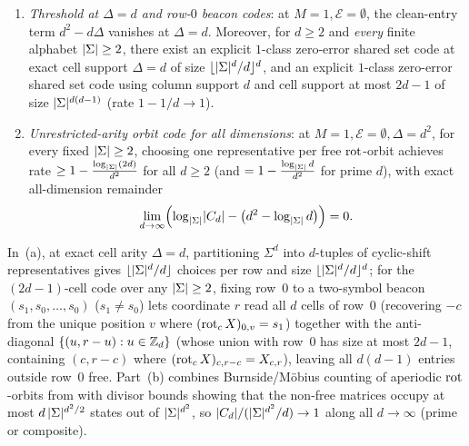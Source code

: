 \begin{proposition}\label{prop:boundary-wall1}
\begin{enumerate}[label=(\alph*)]
\item \emph{Threshold at $\Delta = d$ and row-$0$ beacon codes}: at $M = 1, \mathcal{E} = \emptyset$,
  the clean-entry term $d^2 - d\Delta$ vanishes at $\Delta = d$. Moreover, for $d \ge 2$ and
  \emph{every} finite alphabet $\lvert \Sigma \rvert \ge 2$, there exist an explicit $1$-class zero-error
  shared set code at exact cell support $\Delta = d$ of size $\lfloor \lvert \Sigma \rvert^d / d \rfloor^d$,
  and an explicit $1$-class zero-error shared set code using column support $d$ and cell support at
  most $2d - 1$ of size $\lvert \Sigma \rvert^{d(d-1)}$ (rate $1 - 1/d \to 1$).
\item \emph{Unrestricted-arity orbit code for all dimensions}: at $M = 1, \mathcal{E} = \emptyset,
  \Delta = d^2$, for every fixed $\lvert \Sigma \rvert \ge 2$, choosing one representative per free
  $\operatorname{rot}$-orbit achieves rate $\ge 1 - \frac{\log_{\lvert \Sigma \rvert}(2d)}{d^2}$ for all $d \ge 2$
  (and $= 1 - \frac{\log_{\lvert \Sigma \rvert} d}{d^2}$ for prime $d$), with exact all-dimension remainder
  \[
    \lim_{d\to\infty}\Bigl(\log_{\lvert \Sigma \rvert}\lvert C_d \rvert - \bigl(d^2 - \log_{\lvert \Sigma \rvert} d\bigr)\Bigr) = 0.
  \]
\end{enumerate}
\end{proposition}
\begin{outline}
In~(a), at exact cell arity $\Delta = d$, partitioning $\Sigma^d$ into $d$-tuples of cyclic-shift
representatives gives $\lfloor \lvert \Sigma \rvert^d / d \rfloor$ choices per row and size
$\lfloor \lvert \Sigma \rvert^d / d \rfloor^d$; for the $(2d-1)$-cell code over any $\lvert \Sigma \rvert \ge 2$,
fixing row~$0$ to a two-symbol beacon $(s_1, s_0, \dots, s_0)$ ($s_1 \ne s_0$) lets coordinate $r$
read all $d$ cells of row~$0$ (recovering $-c$ from the unique position $v$ where
$(\operatorname{rot}_c X)_{0,v} = s_1$) together with the anti-diagonal $\{(u, r - u) : u \in \mathbb{Z}_d\}$ (whose union
with row~$0$ has size at most $2d - 1$, containing $(c, r-c)$ where $(\operatorname{rot}_c X)_{c,r-c} = X_{c,r}$),
leaving all $d(d-1)$ entries outside row~$0$ free. Part~(b) combines Burnside/M\"obius counting of
aperiodic $\operatorname{rot}$-orbits from \cite[Appendix~A]{SharedDecoders2026} with divisor bounds showing that
the non-free matrices occupy at most $d\,\lvert \Sigma \rvert^{d^2/2}$ states out of $\lvert \Sigma \rvert^{d^2}$, so
$\lvert C_d \rvert / (\lvert \Sigma \rvert^{d^2}/d) \to 1$ along all $d \to \infty$ (prime or composite).
\end{outline}

